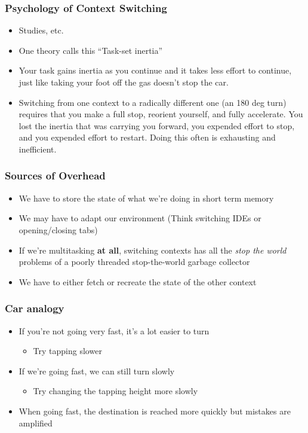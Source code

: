 \documentclass{beamer}
\begin{document}
\begin{frame}
\frametitle{Psychology of Context Switching}
\begin{itemize}
  \item Studies, etc.
  \item One theory calls this ``Task-set inertia''
  \item Your task gains inertia as you continue and it takes less effort to continue, just like taking your foot off the gas doesn't stop the car.
  \item Switching from one context to a radically different one (an 180 deg turn) requires that you make a full stop, reorient yourself, and fully accelerate.
    You lost the inertia that was carrying you forward, you expended effort to stop, and you expended effort to restart. Doing this often is exhausting and inefficient.
\end{itemize}
\end{frame}


\begin{frame}
\frametitle{Sources of Overhead}
\begin{itemize}
  \item We have to store the state of what we're doing in short term memory
  \item We may have to adapt our environment (Think switching IDEs or opening/closing tabs)
  \item If we're multitasking \textbf{at all}, switching contexts has all the \textit{stop the world} problems of a poorly threaded stop-the-world garbage collector
  \item We have to either fetch or recreate the state of the other context
\end{itemize}
\end{frame}


\begin{frame}
\frametitle{Car analogy}
  \begin{itemize}
    \item If you're not going very fast, it's a lot easier to turn
    \begin{itemize}
      \item Try tapping slower
    \end{itemize}
    \item If we're going fast, we can still turn slowly
    \begin{itemize}
      \item Try changing the tapping height more slowly
    \end{itemize}
    \item When going fast, the destination is reached more quickly but mistakes are amplified
  \end{itemize}
\end{frame}
\end{document}
